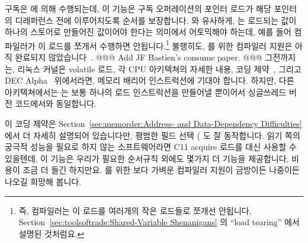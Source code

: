 구독은  에 의해 수행되는데, 이 기능은 구독 오퍼레이션의
포인터 로드가 해당 포인터의 디레퍼런스 전에 이루어지도록 순서를 보장합니다.
 와 유사하게,  는 로드되는 값이
하나의 스토어로 만들어진 값이어야 한다는 의미에서 어토믹해야 하는데, 예를 들어
컴파일러가 이 로드를 쪼개서 수행하면 안됩니다.\footnote{
	즉, 컴파일러는 이 로드를 여러개의 작은 로드들로 쪼개선 안됩니다,
	Section~\ref{sec:toolsoftrade:Shared-Variable Shenanigans} 의 ``load
	tearing'' 에서 설명된 것처럼요.}
불행히도,  를 위한 컴파일러 지원은 아직 완료되지
않았습니다~\cite{PaulEMcKennneyConsumeP0190R4,PaulEMcKenney2017markconsumeP0462R1}.
@@@ Add JF Bastien's consume paper. @@@
그전까지는, 리눅스 커널은 volatile 로드, 각 CPU 아키텍쳐의 자세한 내용, 코딩
제약~\cite{PaulEMcKenney2014rcu-dereference}, 그리고 DEC Alpha~\cite{ALPHA2002}
위에서라면, 메모리 배리어 인스트럭션에 기대야 합니다.
하지만, 다른 아키텍쳐에서는  는 보통 하나의 로드
인스트럭션을 만들어낼 뿐이어서 싱글쓰레드 버전 코드에서와 동일합니다.

이 코딩 제약은
Section~\ref{sec:memorder:Address- and Data-Dependency Difficulties}
에서 더 자세히 설명되어 있습니다만, 평범한 필드 선택 (\qco{->} 도 잘
동작합니다.
읽기 쪽의 궁극적 성능을 필요로 하지 않는 소프트웨어라면 C11 acquire 로드를 대신
사용할 수 있을텐데, 이 기능은 우리가 필요한 순서규칙 외에도 몇가지 더 기능을
제공합니다, 비용이 조금 더 들긴 하지만요.
 를 위한 보다 가벼운 컴파일러 지원이 금방이든 나중이든
나오길 희망해 봅니다.

